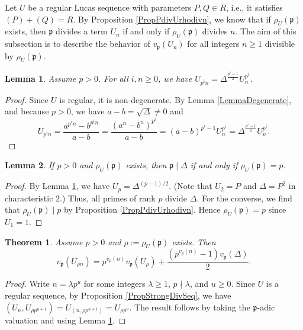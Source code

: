 \documentclass[reqno]{amsart}
\newtheorem{theorem}{Theorem}
\newtheorem{lemma}{Lemma}
\begin{document}
Let $U$ be a regular Lucas sequence with parameters $P,Q\in R$, i.e., it satisfies $(P)+(Q)=R$. By Proposition \ref{PropPdivUrhodivn},  we know that if $\rho_U(\mathfrak{p})$ exists, then $\mathfrak{p}$ divides a term $U_n$ if and only if $\rho_U(\mathfrak{p})$ divides $n$. The aim of this subsection is to describe the behavior of $v_\mathfrak{p}(U_n)$ for all integers $n\geq 1$ divisible by $\rho_U(\mathfrak{p})$.



\begin{lemma}\label{LemmaUpn=}
    Assume $p>0$. For all $i,n\geq 0$, we have $U_{p^i n}=\Delta^{\frac{p^i-1}{2}} U_n^{p^i}$. 
\end{lemma}


\begin{proof}
    Since $U$ is regular, it is non-degenerate. By Lemma \ref{LemmaDegenerate}, and because $p>0$, we have $a-b=\sqrt{\Delta}\ne 0$ and
    \[
    U_{p^in} = \frac{a^{p^in}-b^{p^in}}{a-b} = \frac{(a^n-b^n)^{p^i}}{a-b} = (a-b)^{p^i-1} U_n^{p^i} =\Delta^{\frac{p^i-1}{2}} U_n^{p^{i}}.
    \]
\end{proof}



\begin{lemma}\label{LemmaRho=p}
    If $p>0$ and $\rho_U(\mathfrak{p})$ exists, then $\mathfrak{p}\mid \Delta$ if and only if $\rho_U(\mathfrak{p}) = p$.
\end{lemma}

\begin{proof}
    By Lemma \ref{LemmaUpn=}, we have $U_p = \Delta^{(p-1)/2}$. (Note that $U_2=P$ and $\Delta=P^2$ in characteristic $2$.) Thus, all primes of rank $p$ divide $\Delta$. For the converse, we find that $\rho_U(\mathfrak{p}) \mid p$ by Proposition \ref{PropPdivUrhodivn}. Hence $\rho_U(\mathfrak{p})=p$ since $U_1=1$.
\end{proof}




\begin{theorem}\label{THMvaluationLucas}
    Assume $p>0$ and $\rho:=\rho_U(\mathfrak{p})$ exists. Then
    \[
    v_\mathfrak{p}(U_{\rho n}) = p^{v_p(n)} v_\mathfrak{p}(U_\rho) + \frac{(p^{v_p(n)}-1)v_\mathfrak{p}(\Delta)}{2}.
    \]
\end{theorem}




\begin{proof}
    Write $n=\lambda p^u$ for some integers $\lambda\geq 1$, $p\nmid \lambda$, and $u\geq 0$. Since $U$ is a regular sequence, by Proposition \ref{PropStrongDivSeq}, we have $(U_n, U_{\rho p^{u+1}}) = U_{(n, \rho p^{u+1})} = U_{\rho p^u}$. The result follows by taking the $\mathfrak{p}$-adic valuation and using Lemma \ref{LemmaUpn=}.
    
\end{proof}
\end{document}
